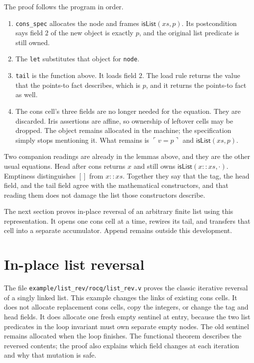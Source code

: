 \documentclass[11pt]{article}
\newcommand{\pure}[1]{\ulcorner #1 \urcorner}
\begin{document}
The proof follows the program in order.
\begin{enumerate}
\item \texttt{cons\_spec} allocates the node and frames \(\mathsf{isList}(xs, p)\).
Its postcondition says field \(2\) of the new object is exactly \(p\), and the original list predicate is still owned.
\item The \texttt{let} substitutes that object for \texttt{node}.
\item \texttt{tail} is the function above.
It loads field \(2\).
The load rule returns the value that the points-to fact describes, which is \(p\), and it returns the points-to fact as well.
\item The cons cell's three fields are no longer needed for the equation.
They are discarded.
Iris assertions are affine, so ownership of leftover cells may be dropped.
The object remains allocated in the machine; the specification simply stops mentioning it.
What remains is \(\pure{v = p}\) and \(\mathsf{isList}(xs, p)\).
\end{enumerate}

Two companion readings are already in the lemmas above, and they are the other usual equations.
Head after cons returns \(x\) and still owns \(\mathsf{isList}(x :: xs, \cdot)\).
Emptiness distinguishes \([]\) from \(x :: xs\).
Together they say that the tag, the head field, and the tail field agree with the mathematical constructors, and that reading them does not damage the list those constructors describe.

The next section proves in-place reversal of an arbitrary finite list using this representation.
It opens one cons cell at a time, rewires its tail, and transfers that cell into a separate accumulator.
Append remains outside this development.

\section{In-place list reversal}
\label{sec:list-reversal}

The file \texttt{example/list\_rev/rocq/list\_rev.v} proves the classic iterative
reversal of a singly linked list. This example changes the links of existing
cons cells. It does not allocate replacement cons cells, copy the integers, or
change the tag and head fields. It does allocate one fresh empty sentinel at
entry, because the two list predicates in the loop invariant must own separate
empty nodes. The old sentinel remains allocated when the loop finishes.
The functional theorem describes the reversed contents; the proof also explains
which field changes at each iteration and why that mutation is safe.
\end{document}
